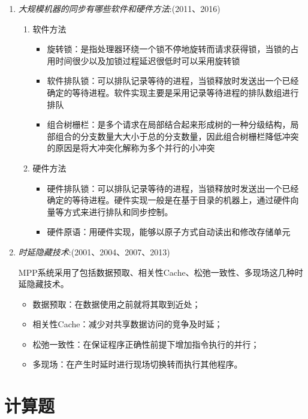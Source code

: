 \documentclass[a4paper]{ctexart}
\begin{document}
\begin{enumerate}
  \item \emph{大规模机器的同步有哪些软件和硬件方法}:(2011、2016)
  \begin{enumerate}
    \item 软件方法
    \begin{itemize}
      \item 旋转锁：是指处理器环绕一个锁不停地旋转而请求获得锁，当锁的占用时间很少以及加锁过程延迟很低时可以采用旋转锁
      \item 软件排队锁：可以排队记录等待的进程，当锁释放时发送出一个已经确定的等待进程。软件实现主要是采用记录等待进程的排队数组进行排队
      \item 组合树栅栏：是多个请求在局部结合起来形成树的一种分级结构，局部组合的分支数量大大小于总的分支数量，因此组合树栅栏降低冲突的原因是将大冲突化解称为多个并行的小冲突
    \end{itemize}
    \item 硬件方法
    \begin{itemize}
      \item 硬件排队锁：可以排队记录等待的进程，当锁释放时发送出一个已经确定的等待进程。硬件实现一般是在基于目录的机器上，通过硬件向量等方式来进行排队和同步控制。
      \item 硬件原语：用硬件实现，能够以原子方式自动读出和修改存储单元
    \end{itemize}
  \end{enumerate}
  
  \item \emph{时延隐藏技术}:(2001、2004、2007、2013)
  
  MPP系统采用了包括数据预取、相关性Cache、松弛一致性、多现场这几种时延隐藏技术。
  \begin{itemize}
    \item 数据预取：在数据使用之前就将其取到近处；
    \item 相关性Cache：减少对共享数据访问的竞争及时延；
    \item 松弛一致性：在保证程序正确性前提下增加指令执行的并行；
    \item 多现场：在产生时延时进行现场切换转而执行其他程序。
  \end{itemize}
  
\end{enumerate}

\newpage
\section{计算题}
\end{document}
